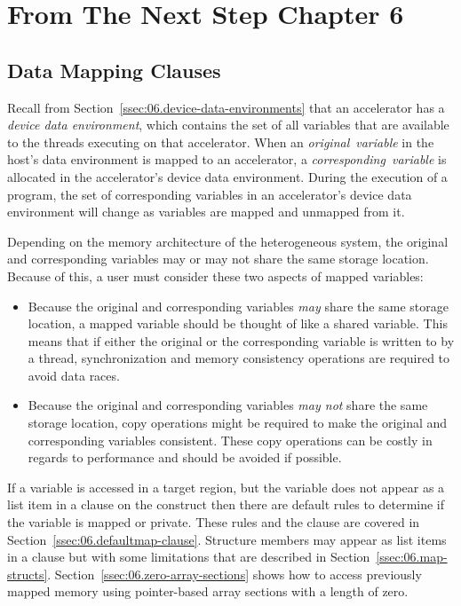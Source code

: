 \section{From The Next Step Chapter 6}
\subsection{Data Mapping Clauses}
\label{sec:06.data-mapping-clauses}

Recall from Section~\ref{ssec:06.device-data-environments} that an accelerator has a
\emph{device data environment}, which contains the set of all variables that are
available to the threads executing on that accelerator.  When an 
\emph{original}~\emph{variable} in the host's data environment is mapped to an accelerator, a
\emph{corresponding}~\emph{variable} is allocated in the accelerator's device data
environment.  During the execution of a program, the set of corresponding
variables in an accelerator's device data environment will change as variables
are mapped and unmapped from it.

Depending on the memory architecture of the heterogeneous system, the original
and corresponding variables may or may not share the same storage location.
Because of this, a user must consider these two aspects of mapped
variables: \begin{itemize}

    \item Because the original and corresponding variables \emph{may} share the
    same storage location, a mapped variable should be thought of like a shared
    variable.  This means that if either the original or the corresponding
    variable is written to by a thread, synchronization and memory consistency
    operations are required to avoid data races.

    \item Because the original and corresponding variables \emph{may not} share
    the same storage location, copy operations might be required to make the
    original and corresponding variables consistent.  These copy operations can
    be costly in regards to performance and should be
    avoided if possible.

\end{itemize}

If a variable is accessed in a target
region, but the variable does not appear as a list item in a  clause
on the construct then there are default rules to determine if the variable is
mapped or private.  These rules and the  clause are covered in
Section~\ref{ssec:06.defaultmap-clause}.  Structure members may appear as list
items in a  clause but with some limitations that are described in
Section~\ref{ssec:06.map-structs}.
Section~\ref{ssec:06.zero-array-sections} shows how to access
previously mapped memory using pointer-based array sections with a length of
zero.

